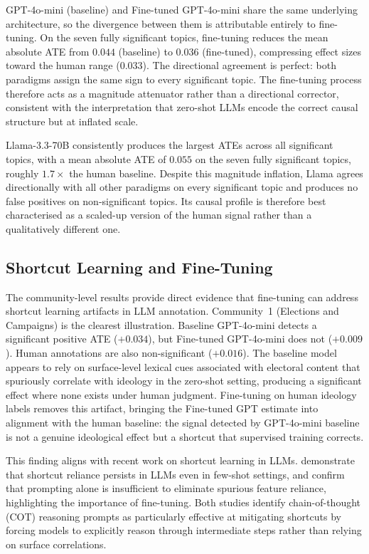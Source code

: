 GPT-4o-mini (baseline) and Fine-tuned GPT-4o-mini share the same underlying architecture, so the divergence between them is attributable entirely to fine-tuning. On the seven fully significant topics, fine-tuning reduces the mean absolute ATE from $0.044$ (baseline) to $0.036$ (fine-tuned), compressing effect sizes toward the human range ($0.033$). The directional agreement is perfect: both paradigms assign the same sign to every significant topic. The fine-tuning process therefore acts as a magnitude attenuator rather than a directional corrector, consistent with the interpretation that zero-shot LLMs encode the correct causal structure but at inflated scale.

Llama-3.3-70B consistently produces the largest ATEs across all significant topics, with a mean absolute ATE of $0.055$ on the seven fully significant topics, roughly $1.7\times$ the human baseline. Despite this magnitude inflation, Llama agrees directionally with all other paradigms on every significant topic and produces no false positives on non-significant topics. Its causal profile is therefore best characterised as a scaled-up version of the human signal rather than a qualitatively different one.

\subsection{Shortcut Learning and Fine-Tuning}
\label{sec:shortcut-learning}

The community-level results provide direct evidence that fine-tuning can address shortcut learning artifacts in LLM annotation. Community~1 (Elections and Campaigns) is the clearest illustration. Baseline GPT-4o-mini detects a significant positive ATE ($+0.034$), but Fine-tuned GPT-4o-mini does not ($+0.009$). Human annotations are also non-significant ($+0.016$). The baseline model appears to rely on surface-level lexical cues associated with electoral content that spuriously correlate with ideology in the zero-shot setting, producing a significant effect where none exists under human judgment. Fine-tuning on human ideology labels removes this artifact, bringing the Fine-tuned GPT estimate into alignment with the human baseline: the signal detected by GPT-4o-mini baseline is not a genuine ideological effect but a shortcut that supervised training corrects.

This finding aligns with recent work on shortcut learning in LLMs. \citet{yuan2024llmsovercomeshortcutlearning} demonstrate that shortcut reliance persists in LLMs even in few-shot settings, and \citet{sun-etal-2024-exploring} confirm that prompting alone is insufficient to eliminate spurious feature reliance, highlighting the importance of fine-tuning. Both studies identify chain-of-thought (COT) reasoning prompts as particularly effective at mitigating shortcuts by forcing models to explicitly reason through intermediate steps rather than relying on surface correlations.

